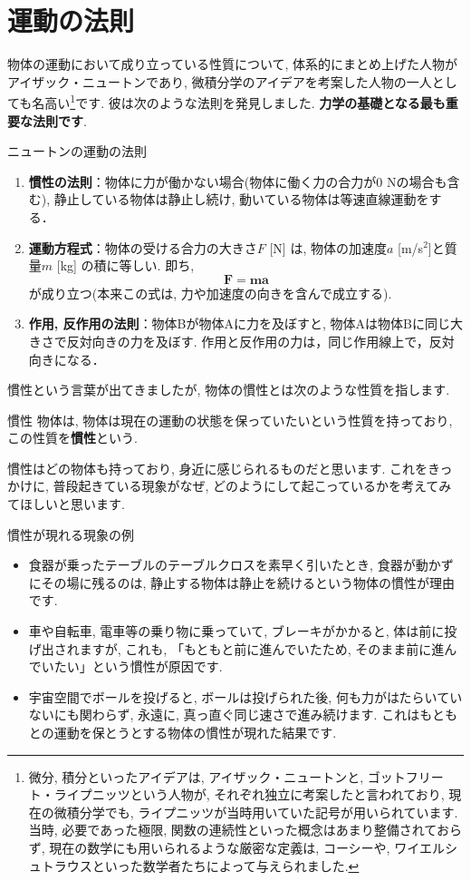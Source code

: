 \documentclass[11pt,dvipdfmx]{jsarticle}
\numberwithin{equation}{section} %
\begin{document}
\section{運動の法則}
物体の運動において成り立っている性質について, 体系的にまとめ上げた人物がアイザック・ニュートンであり, 微積分学のアイデアを考案した人物の一人としても名高い\footnote{微分, 積分といったアイデアは, アイザック・ニュートンと, ゴットフリート・ライプニッツという人物が, それぞれ独立に考案したと言われており, 現在の微積分学でも, ライプニッツが当時用いていた記号が用いられています. 当時, 必要であった極限, 関数の連続性といった概念はあまり整備されておらず, 現在の数学にも用いられるような厳密な定義は, コーシーや, ワイエルシュトラウスといった数学者たちによって与えられました. }です. 彼は次のような法則を発見しました. \textbf{力学の基礎となる最も重要な法則です}.
\begin{freebox}{ニュートンの運動の法則}
    \begin{enumerate}
        \item \textbf{慣性の法則}：物体に力が働かない場合(物体に働く力の合力が0 Nの場合も含む), 静止している物体は静止し続け, 動いている物体は等速直線運動をする．
        \item \textbf{運動方程式}：物体の受ける合力の大きさ$F$ [N] は, 物体の加速度$a$ [m/s$^2$]と質量$m$ [kg] の積に等しい. 即ち, 
        \begin{equation}
            \bm{F} = \bm{ma} \label{運動方程式}
        \end{equation}
        が成り立つ(本来この式は, 力や加速度の向きを含んで成立する).
        \item \textbf{作用, 反作用の法則}：物体Bが物体Aに力を及ぼすと, 物体Aは物体Bに同じ大きさで反対向きの力を及ぼす. 作用と反作用の力は，同じ作用線上で，反対向きになる．
    \end{enumerate}
\end{freebox}
慣性という言葉が出てきましたが, 物体の慣性とは次のような性質を指します.
\begin{freebox}{慣性}
    物体は, 物体は現在の運動の状態を保っていたいという性質を持っており, この性質を\textbf{慣性}という.
\end{freebox}
慣性はどの物体も持っており, 身近に感じられるものだと思います. これをきっかけに, 普段起きている現象がなぜ, どのようにして起こっているかを考えてみてほしいと思います.
\begin{exbox}{慣性が現れる現象の例}
   \begin{itemize}
    \item 食器が乗ったテーブルのテーブルクロスを素早く引いたとき, 食器が動かずにその場に残るのは, 静止する物体は静止を続けるという物体の慣性が理由です.
    \item 車や自転車, 電車等の乗り物に乗っていて, ブレーキがかかると, 体は前に投げ出されますが, これも, 「もともと前に進んでいたため, そのまま前に進んでいたい」という慣性が原因です.
    \item 宇宙空間でボールを投げると, ボールは投げられた後, 何も力がはたらいていないにも関わらず, 永遠に, 真っ直ぐ同じ速さで進み続けます. これはもともとの運動を保とうとする物体の慣性が現れた結果です.
\end{itemize} 
\end{exbox}
\end{document}
